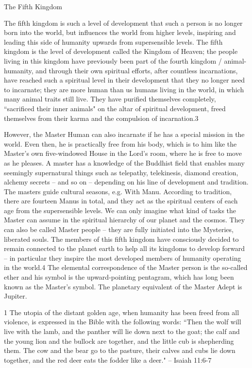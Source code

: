 \begin{footnotesize}
\begin{sffamily}
The Fifth Kingdom

The fifth kingdom is such a level of development that such a person is no longer born into the world, but influences the world from higher levels, inspiring and leading this side of humanity upwards from supersensible levels. The fifth kingdom is the level of development called the Kingdom of Heaven; the people living in this kingdom have previously been part of the fourth kingdom / animal-humanity, and through their own spiritual efforts, after countless incarnations, have reached such a spiritual level in their development that they no longer need to incarnate; they are more human than us humans living in the world, in which many animal traits still live. They have purified themselves completely, ``sacrificed their inner animals" on the altar of spiritual development, freed themselves from their karma and the compulsion of incarnation.3

However, the Master Human can also incarnate if he has a special mission in the world. Even then, he is practically free from his body, which is to him like the Master's own five-windowed House in the Lord's room, where he is free to move as he pleases. A master has a knowledge of the Buddhist field that enables many seemingly supernatural things such as telepathy, telekinesis, diamond creation, alchemy secrets – and so on – depending on his line of development and tradition. The masters guide cultural seasons, e.g. With Manu. According to tradition, there are fourteen Manus in total, and they act as the spiritual centers of each age from the supersensible levels. We can only imagine what kind of tasks the Master can assume in the spiritual hierarchy of our planet and the cosmos. They can also be called Master people – they are fully initiated into the Mysteries, liberated souls. The members of this fifth kingdom have consciously decided to remain connected to the planet earth to help all its kingdoms to develop forward – in particular they inspire the most developed members of humanity operating in the world.4 The elemental correspondence of the Master person is the so-called ether and his symbol is the upward-pointing pentagram, which has long been known as the Master's symbol. The planetary equivalent of the Master Adept is Jupiter.

1 The utopia of the distant golden age, when humanity has been freed from all violence, is expressed in the Bible with the following words: ``Then the wolf will live with the lamb, and the panther will lie down next to the goat; the calf and the young lion and the bullock are together, and the little cub is shepherding them. The cow and the bear go to the pasture, their calves and cubs lie down together, and the red deer eats the fodder like a deer." – Isaiah 11:6-7


\end{sffamily}
\end{footnotesize}

